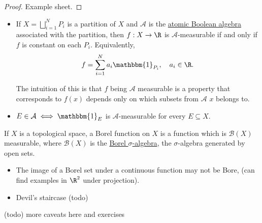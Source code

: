 \documentclass{article}
\newcommand{\1}[1]{\mathbbm{1}_{#1}}
\begin{document}
\begin{proof}
    Example sheet.
\end{proof}


\begin{remark}
    \leavevmode
    \begin{itemize}
        \item If $X = \bigsqcup_{i=1}^N P_i$ is a partition of $X$ and $\mathcal{A}$ is the \hyperlink{def:atomicBooleanAlgebra}{atomic Boolean algebra} associated with the partition, then $f:X \to \R$ is $\mathcal{A}$-measurable if and only if $f$ is constant on each $P_i$.
            Equivalently,
            \begin{equation*}
                f = \sum_{i=1}^N a_i \1{P_i},\quad a_i \in \R.
            \end{equation*}

            The intuition of this is that $f$ being $\mathcal{A}$ measurable is a property that corresponds to $f(x)$ depends only on which subsets from $\mathcal{A}$ $x$ belongs to.
        \item $E \in \mathcal{A} \iff \1{E}$ is $\mathcal{A}$-measurable for every $E \subseteq X$.
    \end{itemize}
\end{remark}

\begin{defi}
    If $X$ is a topological space, a Borel function on $X$ is a function which is $\mathcal{B}(X)$ measurable, where $\mathcal{B}(X)$ is the \hyperlink{def:borelAlg}{Borel $\sigma$-algebra}, the $\sigma$-algebra generated by open sets.
\end{defi}

\begin{remark}
    \leavevmode
    \begin{itemize}
        \item The image of a Borel set under a continuous function may not be Bore, (can find examples in $\R^2$ under projection).
        \item Devil's staircase (todo)
    \end{itemize}
\end{remark}

(todo) more caveats here and exercises

\clearpage
\end{document}
